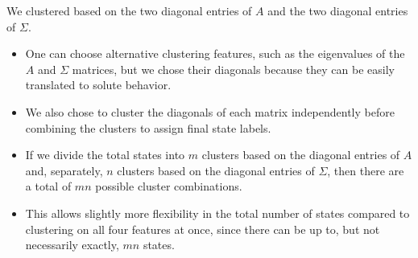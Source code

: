 \documentclass{article}
\begin{document}
  We clustered based on the two diagonal entries of $A$ and the two diagonal entries 
  of $\Sigma$.
  \begin{itemize}
   \item One can choose alternative clustering features, such as the eigenvalues of
   the $A$ and $\Sigma$ matrices, but we chose their diagonals because they can be
   easily translated to solute behavior.
   \item We also chose to cluster the diagonals of each matrix independently before
   combining the clusters to assign final state labels. 
   \item If we divide the total states into $m$ clusters based on the diagonal entries
   of $A$ and, separately, $n$ clusters based on the diagonal entries of $\Sigma$,
   then there are a total of $mn$ possible cluster combinations.
   \item This allows slightly more flexibility in the total number of states compared
   to clustering on all four features at once, since there can be up to, but not 
   necessarily exactly, $mn$ states. 
  \end{itemize} 
  
\end{document}
